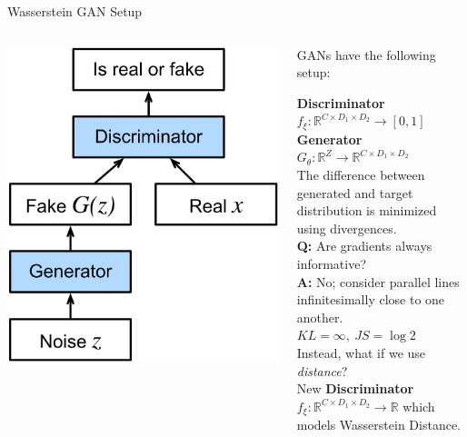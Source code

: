 \documentclass{beamer}
\begin{document}
\begin{frame}{Wasserstein GAN Setup}
	\begin{columns}
		\begin{column}{.4\textwidth}
			\begin{center}
				\includegraphics[width=\textwidth]{img/gan.png}
			\end{center}
		\end{column}
		\begin{column}{.6\textwidth}
			GANs have the following setup:

			\textbf{Discriminator} $f_\xi: \mathbb{R}^{C \times D_1 \times D_2} \rightarrow [0, 1]$
			\textbf{Generator} $G_\theta: \mathbb{R}^{Z} \rightarrow \mathbb{R}^{C \times D_1 \times D_2}$ \pause \newline \\

			The difference between generated and target distribution is minimized using divergences. \pause \newline \\

			\textbf{Q:} Are gradients always informative? \pause \\
			\textbf{A:} No; consider parallel lines infinitesimally close to one another. $KL = \infty,~JS = \log 2$ \pause \newline \\

			Instead, what if we use \textit{distance}? \pause \newline \\
			New \textbf{Discriminator} $f_\xi: \mathbb{R}^{C \times D_1 \times D_2} \rightarrow \mathbb{R}$
			which models Wasserstein Distance.
		\end{column}
	\end{columns}
\end{frame}
\end{document}
